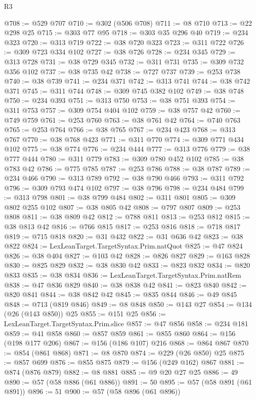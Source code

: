 \begin{lexlean}{R3}
\begin{coremodule}
@708 := @529 @707
@710 := @302 (@506 @708)
@711 := @8 @710
@713 := @22 @298 @25
@715 := @303 @77 @95
@718 := @303 @35 @296 @40
@719 := @234 @323
@720 := @313 @719
@722 := @38 @720 @323
@723 := @311 @722
@726 := @309 @723 @334 @102
@727 := @38 @726
@728 := @234 @345
@729 := @313 @728
@731 := @38 @729 @345
@732 := @311 @731
@735 := @309 @732 @356 @102
@737 := @38 @735 @42
@738 := @727 @737
@739 := @253 @738
@740 := @38 @739
@741 := @234 @371
@742 := @313 @741
@744 := @38 @742 @371
@745 := @311 @744
@748 := @309 @745 @382 @102
@749 := @38 @748
@750 := @234 @393
@751 := @313 @750
@753 := @38 @751 @393
@754 := @311 @753
@757 := @309 @754 @404 @102
@759 := @38 @757 @42
@760 := @749 @759
@761 := @253 @760
@763 := @38 @761 @42
@764 := @740 @763
@765 := @253 @764
@766 := @38 @765
@767 := @234 @423
@768 := @313 @767
@770 := @38 @768 @423
@771 := @311 @770
@774 := @309 @771 @434 @102
@775 := @38 @774
@776 := @234 @444
@777 := @313 @776
@779 := @38 @777 @444
@780 := @311 @779
@783 := @309 @780 @452 @102
@785 := @38 @783 @42
@786 := @775 @785
@787 := @253 @786
@788 := @38 @787
@789 := @234 @466
@790 := @313 @789
@792 := @38 @790 @466
@793 := @311 @792
@796 := @309 @793 @474 @102
@797 := @38 @796
@798 := @234 @484
@799 := @313 @798
@801 := @38 @799 @484
@802 := @311 @801
@805 := @309 @802 @255 @102
@807 := @38 @805 @42
@808 := @797 @807
@809 := @253 @808
@811 := @38 @809 @42
@812 := @788 @811
@813 := @253 @812
@815 := @38 @813 @42
@816 := @766 @815
@817 := @253 @816
@818 := @718 @817
@819 := @715 @818
@820 := @31 @432
@822 := @31 @636 @42
@823 := @38 @822
@824 := LexLeanTarget.TargetSyntax.Prim.natQuot
@825 := @47 @824
@826 := @38 @404
@827 := @103 @42
@828 := @826 @827
@829 := @163 @828
@830 := @825 @829
@832 := @38 @830 @42
@833 := @823 @832
@834 := @820 @833
@835 := @38 @834
@836 := LexLeanTarget.TargetSyntax.Prim.natRem
@838 := @47 @836 @829
@840 := @38 @838 @42
@841 := @823 @840
@842 := @820 @841
@844 := @38 @842 @42
@845 := @835 @844
@846 := @49 @845
@848 := @713 (@819 @846)
@849 := @8 @848
@850 := @143 @27
@854 := @134 (@26 (@143 @850)) @25
@855 := @151 @25
@856 := LexLeanTarget.TargetSyntax.Prim.slice
@857 := @47 @856
@858 := @234 @181
@859 := @41 @858
@860 := @857 @859
@861 := @855 @860
@864 := @156 (@198 @177 @206)
@867 := @156 (@186 @107) @216
@868 := @864 @867
@870 := @854 (@861 @868)
@871 := @8 @870
@874 := @229 (@26 @850) @25
@875 := @857 @699
@876 := @855 @875
@879 := @156 (@249 @162) @867
@881 := @874 (@876 @879)
@882 := @8 @881
@885 := @9 @20 @27 @25
@886 := 49
@890 := @57 (@58 @886 (@61 @886))
@891 := 50
@895 := @57 (@58 @891 (@61 @891))
@896 := 51
@900 := @57 (@58 @896 (@61 @896))

\end{coremodule}
\end{lexlean}
